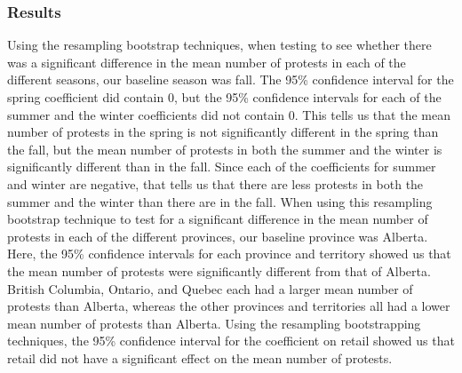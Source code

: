 \documentclass[12pt]{article}
\begin{document}
\subsubsection*{Results}
Using the resampling bootstrap techniques, when testing to see whether there was a significant difference in the mean number of protests in each of the different seasons, our baseline season was fall. The 95\% confidence interval for the spring coefficient did contain 0, but the 95\% confidence intervals for each of the summer and the winter coefficients did not contain 0. This tells us that the mean number of protests in the spring is not significantly different in the spring than the fall, but the mean number of protests in both the summer and the winter is significantly different than in the fall. Since each of the coefficients for summer and winter are negative, that tells us that there are less protests in both the summer and the winter than there are in the fall.
When using this resampling bootstrap technique to test for a significant difference in the mean number of protests in each of the different provinces, our baseline province was Alberta. Here, the 95\% confidence intervals for each province and territory showed us that the mean number of protests were significantly different from that of Alberta. British Columbia, Ontario, and Quebec each had a larger mean number of protests than Alberta, whereas the other provinces and territories all had a lower mean number of protests than Alberta.
Using the resampling bootstrapping techniques, the 95\% confidence interval for the coefficient on retail showed us that retail did not have a significant effect on the mean number of protests.
\end{document}
